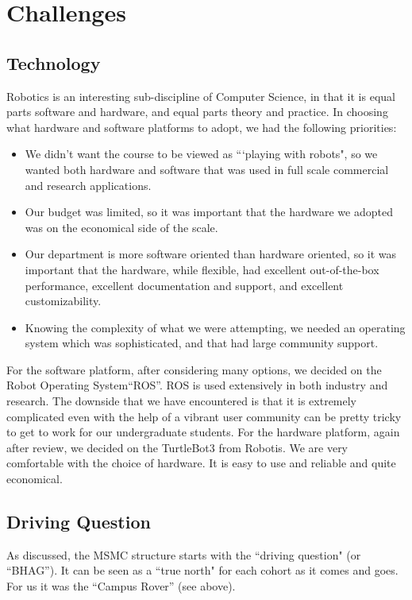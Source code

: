 \section{Challenges}

\subsection{Technology} Robotics is an interesting sub-discipline of Computer Science, in that it is equal parts software and hardware, and equal parts theory and practice. In choosing what hardware and software platforms to adopt, we had the following priorities:
\begin{itemize}
    \item We didn't want the course to be viewed as ```playing with robots", so we wanted both hardware and software that was used in full scale commercial and research applications. 
    \item Our budget was limited, so it was important that the hardware we adopted was on the economical side of the scale.
    \item Our department is more software oriented than hardware oriented, so it was important that the hardware, while flexible, had excellent out-of-the-box performance, excellent documentation and support, and excellent customizability.
    \item Knowing the complexity of what we were attempting, we needed an operating system which was sophisticated, and that had large community support.
\end{itemize}
For the software platform, after considering many options, we decided on the Robot Operating System``ROS''\cite{ROS}. ROS is used extensively in both industry and research. The downside that we have encountered is that it is extremely complicated even with the help of a vibrant user community can be pretty tricky to get to work for our undergraduate students. For the hardware platform, again after review, we decided on the TurtleBot3\cite{Turtle} from Robotis. We are very comfortable with the choice of hardware. It is easy to use and reliable and quite economical.

\subsection{Driving Question} As discussed, the MSMC structure starts with the ``driving question" (or ``BHAG''). It can be seen as a  ``true north" for each cohort as it comes and goes. For us it was the ``Campus Rover'' (see above). 


